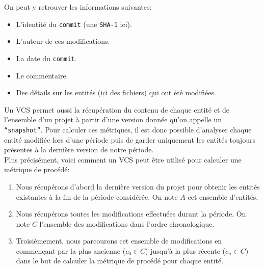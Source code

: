On peut y retrouver les informations suivantes: 
\begin{itemize}
\item L'identité du \texttt{commit} (une \texttt{SHA-1} ici).
\item L'auteur de ces modifications.
\item La date du \texttt{commit}.
\item Le commentaire.
\item Des détails sur les entités (ici des fichiers) qui ont été modifiées.\\
\end{itemize}

Un VCS permet aussi la récupération du contenu de chaque entité et de l'ensemble d'un projet à partir d'une version donnée qu'on appelle un \texttt{``snapshot''}. Pour calculer ces métriques, il est donc possible d'analyser chaque entité modifiée lors d'une période puis de garder uniquement les entités toujours présentes à la dernière version de notre période.\\

Plus précisément, voici comment un VCS peut être utilisé pour calculer une métrique de procédé: 
\begin{enumerate}
\item Nous récupérons d'abord la dernière version du projet pour obtenir les entités existantes à la fin de la période considérée. On note $A$ cet ensemble d'entités.
\item Nous récupérons toutes les modifications effectuées durant la période. On note $C$ l'ensemble des modifications dans l'ordre chronologique.
\item Troisièmement, nous parcourons cet ensemble de modifications en commençant par la plus ancienne ($c_0 \in C$) jusqu'à la plus récente ($c_n \in C$) dans le but de calculer la métrique de procédé pour chaque entité.
\end{enumerate}


